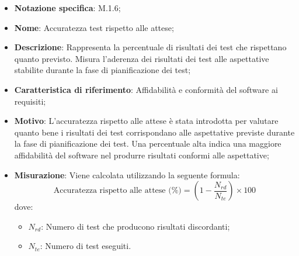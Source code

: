 \begin{itemize}
    \item \textbf{Notazione specifica}: M.1.6;
    \item \textbf{Nome}: Accuratezza test rispetto alle attese;
    \item \textbf{Descrizione}: Rappresenta la percentuale di risultati dei test che rispettano quanto previsto. Misura l'aderenza dei risultati dei test alle aspettative stabilite durante la fase di pianificazione dei test;
    \item \textbf{Caratteristica di riferimento}: Affidabilità e conformità del software ai requisiti;
    \item \textbf{Motivo}: L'accuratezza rispetto alle attese è stata introdotta per valutare quanto bene i risultati dei test corrispondano alle aspettative previste durante la fase di pianificazione dei test. Una percentuale alta indica una maggiore affidabilità del software nel produrre risultati conformi alle aspettative;
    \item \textbf{Misurazione}: Viene calcolata utilizzando la seguente formula:
    \[
    \text{Accuratezza rispetto alle attese (\%)} = \left(1 - \frac{N_{rd}}{N_{te}}\right) \times 100
    \]
    dove:
    \begin{itemize}
        \item $N_{rd}$: Numero di test che producono risultati discordanti;
        \item $N_{te}$: Numero di test eseguiti.
    \end{itemize} 
\end{itemize}
